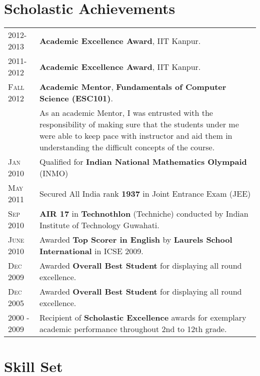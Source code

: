 \documentclass[a4paper,10pt]{article} %
\begin{document}
\section{Scholastic Achievements}

\begin{tabular}{>{\raggedleft}p{2.2cm}p{14cm}}

    \textsc{2012-2013}   & \textbf{Academic Excellence Award}, IIT Kanpur. \\
    \textsc{2011-2012}   & \textbf{Academic Excellence Award}, IIT Kanpur. \\
    \textsc{Fall 2012}   & \textbf{Academic Mentor}, \textbf{Fundamentals of Computer Science (ESC101)}. \\
                         & \footnotesize{As an academic Mentor, I was entrusted with the responsibility of making sure
                            that the students under me were able to keep pace with instructor and aid them in understanding
                            the difficult concepts of the course. }\\
    \textsc{Jan 2010}    & Qualified for \textbf{Indian National Mathematics Olympaid} (INMO) \\
    \textsc{May 2011}    & Secured All India rank \textbf{1937} in Joint Entrance Exam (JEE) \\
    \textsc{Sep 2010}    & \textbf{AIR 17} in \textbf{Technothlon} (Techniche) conducted by Indian Institute of Technology Guwahati. \\
    \textsc{June 2010}   & Awarded \textbf{Top Scorer in English} by \textbf{Laurels School International} in ICSE 2009. \\
    \textsc{Dec 2009}    & Awarded \textbf{Overall Best Student} for displaying all round excellence. \\
    \textsc{Dec 2005}    & Awarded \textbf{Overall Best Student} for displaying all round excellence. \\
    \textsc{2000 - 2009} & Recipient of \textbf{Scholastic Excellence} awards for exemplary academic
                           performance throughout 2nd to 12th grade. \\

\end{tabular}

\section{Skill Set}
\end{document}
